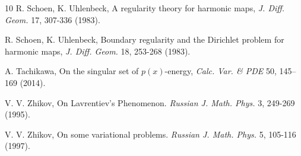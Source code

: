 \documentclass[a4paper]{amsart}
\theoremstyle{plain}  %
\numberwithin{equation}{section}
\begin{document}
\begin{thebibliography}{10}
 R. Schoen, K. Uhlenbeck, A regularity theory for harmonic maps, \emph{J. Diff. Geom.} 17, 307-336 (1983). 

 R. Schoen, K. Uhlenbeck, Boundary regularity and the Dirichlet problem for harmonic maps, \emph{J. Diff.
Geom.} 18, 253-268 (1983).

 A. Tachikawa, On the singular set of $p(x)$-energy, \emph{Calc. Var. \& PDE} 50, 145–169 (2014).


  V. V. Zhikov, On Lavrentiev's Phenomenon. {\em Russian J. Math. Phys.} 3, 249-269 (1995). 
 
 V. V. Zhikov, On some variational problems. \emph{Russian J. Math. Phys.}  5, 105-116 (1997).

    \end{thebibliography}
\end{document}
